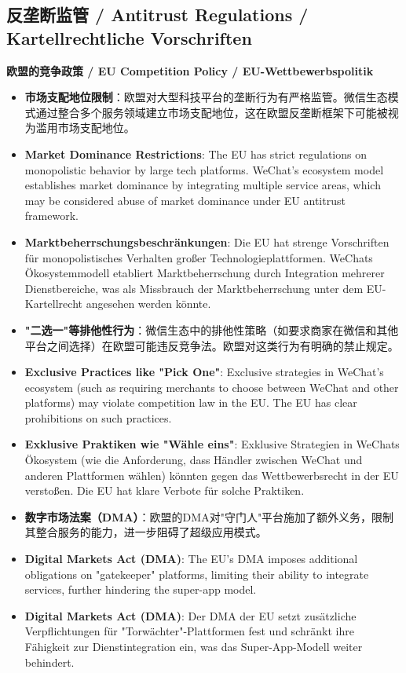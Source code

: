 \documentclass[11pt,a4paper]{article}
\begin{document}
\subsection{反垄断监管 / Antitrust Regulations / Kartellrechtliche Vorschriften}

\textbf{欧盟的竞争政策 / EU Competition Policy / EU-Wettbewerbspolitik}

\begin{itemize}
    \item \textbf{市场支配地位限制}：欧盟对大型科技平台的垄断行为有严格监管。微信生态模式通过整合多个服务领域建立市场支配地位，这在欧盟反垄断框架下可能被视为滥用市场支配地位。
    \item \textbf{Market Dominance Restrictions}: The EU has strict regulations on monopolistic behavior by large tech platforms. WeChat's ecosystem model establishes market dominance by integrating multiple service areas, which may be considered abuse of market dominance under EU antitrust framework.
    \item \textbf{Marktbeherrschungsbeschränkungen}: Die EU hat strenge Vorschriften für monopolistisches Verhalten großer Technologieplattformen. WeChats Ökosystemmodell etabliert Marktbeherrschung durch Integration mehrerer Dienstbereiche, was als Missbrauch der Marktbeherrschung unter dem EU-Kartellrecht angesehen werden könnte.
    
    \item \textbf{"二选一"等排他性行为}：微信生态中的排他性策略（如要求商家在微信和其他平台之间选择）在欧盟可能违反竞争法。欧盟对这类行为有明确的禁止规定。
    \item \textbf{Exclusive Practices like "Pick One"}: Exclusive strategies in WeChat's ecosystem (such as requiring merchants to choose between WeChat and other platforms) may violate competition law in the EU. The EU has clear prohibitions on such practices.
    \item \textbf{Exklusive Praktiken wie "Wähle eins"}: Exklusive Strategien in WeChats Ökosystem (wie die Anforderung, dass Händler zwischen WeChat und anderen Plattformen wählen) könnten gegen das Wettbewerbsrecht in der EU verstoßen. Die EU hat klare Verbote für solche Praktiken.
    
    \item \textbf{数字市场法案（DMA）}：欧盟的DMA对"守门人"平台施加了额外义务，限制其整合服务的能力，进一步阻碍了超级应用模式。
    \item \textbf{Digital Markets Act (DMA)}: The EU's DMA imposes additional obligations on "gatekeeper" platforms, limiting their ability to integrate services, further hindering the super-app model.
    \item \textbf{Digital Markets Act (DMA)}: Der DMA der EU setzt zusätzliche Verpflichtungen für "Torwächter"-Plattformen fest und schränkt ihre Fähigkeit zur Dienstintegration ein, was das Super-App-Modell weiter behindert.
\end{itemize}
\end{document}

